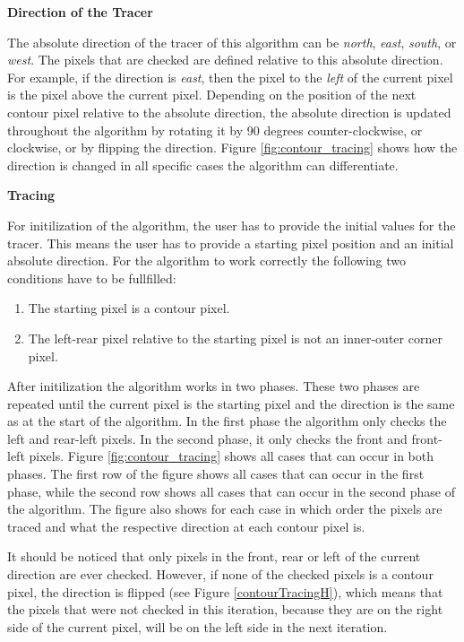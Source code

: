 \documentclass[thesis.tex]{subfiles}
\begin{document}
\textbf{Direction of the Tracer}

The absolute direction of the tracer of this algorithm can be \textit{north}, \textit{east}, \textit{south}, or \textit{west}. The pixels that are checked are defined relative to this absolute direction. For example, if the direction is \textit{east}, then the pixel to the \textit{left} of the current pixel is the pixel above the current pixel. Depending on the position of the next contour pixel relative to the absolute direction, the absolute direction is updated throughout the algorithm by rotating it by 90 degrees counter-clockwise, or clockwise, or by flipping the direction. Figure \ref{fig:contour_tracing} shows how the direction is changed in all specific cases the algorithm can differentiate.

\textbf{Tracing}

For initilization of the algorithm, the user has to provide the initial values for the tracer. This means the user has to provide a starting pixel position and an initial absolute direction. For the algorithm to work correctly the following two conditions have to be fullfilled:
\begin{enumerate}
\item{The starting pixel is a contour pixel.}
\item{The left-rear pixel relative to the starting pixel is not an inner-outer corner pixel.}
\label{starting_pixel_conditions}
\end{enumerate}
  
After initilization the algorithm works in two phases. These two phases are repeated until the current pixel is the starting pixel and the direction is the same as at the start of the algorithm. In the first phase the algorithm only checks the left and rear-left pixels. In the second phase, it only checks the front and front-left pixels. Figure \ref{fig:contour_tracing} shows all cases that can occur in both phases. The first row of the figure shows all cases that can occur in the first phase, while the second row shows all cases that can occur in the second phase of the algorithm. The figure also shows for each case in which order the pixels are traced and what the respective direction at each contour pixel is.

It should be noticed that only pixels in the front, rear or left of the current direction are ever checked. However, if none of the checked pixels is a contour pixel, the direction is flipped (see Figure \ref{contourTracingH}), which means that the pixels that were not checked in this iteration, because they are on the right side of the current pixel, will be on the left side in the next iteration.
\end{document}
